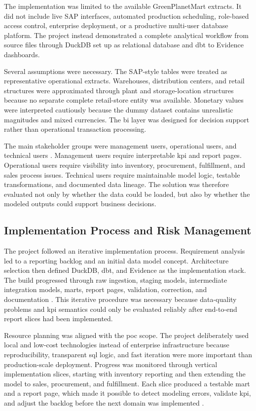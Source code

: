 The implementation was limited to the available GreenPlanetMart extracts. It did not include live SAP interfaces, automated production scheduling, role-based access control, enterprise deployment, or a productive multi-user database platform. The project instead demonstrated a complete analytical workflow from source files through DuckDB set up as relational database and \ac{dbt} to Evidence dashboards.

Several assumptions were necessary. The SAP-style tables were treated as representative operational extracts. Warehouses, distribution centers, and retail structures were approximated through plant and storage-location structures because no separate complete retail-store entity was available. Monetary values were interpreted cautiously because the dummy dataset contains unrealistic magnitudes and mixed currencies. The \ac{bi} layer was designed for decision support rather than operational transaction processing.

The main stakeholder groups were management users, operational users, and technical users \parencite[3-4]{sharp_stakeholder_1999}. Management users require interpretable \ac{kpi} and report pages. Operational users require visibility into inventory, procurement, fulfillment, and sales process issues. Technical users require maintainable model logic, testable transformations, and documented data lineage. The solution was therefore evaluated not only by whether the data could be loaded, but also by whether the modeled outputs could support business decisions.

\subsection{Implementation Process and Risk Management}

The project followed an iterative implementation process. Requirement analysis led to a reporting backlog and an initial data model concept. Architecture selection then defined DuckDB, \ac{dbt}, and Evidence as the implementation stack. The build progressed through raw ingestion, staging models, intermediate integration models, marts, report pages, validation, correction, and documentation \parencite[2]{plotnikova_adapting_2021}. This iterative procedure was necessary because data-quality problems and \ac{kpi} semantics could only be evaluated reliably after end-to-end report slices had been implemented.

Resource planning was aligned with the \ac{poc} scope. The project deliberately used local and low-cost technologies instead of enterprise infrastructure because reproducibility, transparent \ac{sql} logic, and fast iteration were more important than production-scale deployment. Progress was monitored through vertical implementation slices, starting with inventory reporting and then extending the model to sales, procurement, and fulfillment. Each slice produced a testable mart and a report page, which made it possible to detect modeling errors, validate \ac{kpi}, and adjust the backlog before the next domain was implemented \parencite[5-9]{plotnikova_adapting_2021}.


